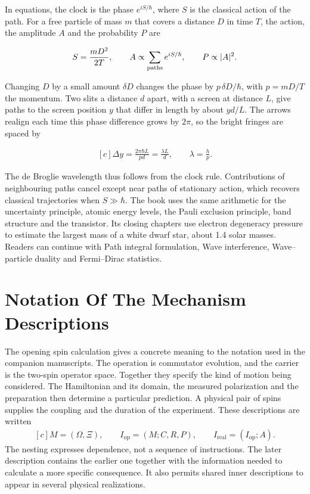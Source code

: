\documentclass[11pt,oneside]{book}
\newenvironment{centeredalign}{\[\begin{gathered}[c]}{\end{gathered}\]}
\begin{document}
In equations, the clock is the phase \(e^{iS/\hbar}\), where \(S\) is the classical action of the path. For a free particle of mass \(m\) that covers a distance \(D\) in time \(T\), the action, the amplitude \(A\) and the probability \(P\) are

\begin{centeredalign}
S=\frac{mD^2}{2T},\qquad A\propto\sum_{\rm paths}e^{iS/\hbar},\qquad P\propto|A|^2 .
\end{centeredalign}

Changing \(D\) by a small amount \(\delta D\) changes the phase by \(p\,\delta D/\hbar\), with \(p=mD/T\) the momentum. Two slits a distance \(d\) apart, with a screen at distance \(L\), give paths to the screen position \(y\) that differ in length by about \(yd/L\). The arrows realign each time this phase difference grows by \(2\pi\), so the bright fringes are spaced by

\begin{centeredalign}
\Delta y=\frac{2\pi\hbar L}{pd}=\frac{\lambda L}{d},\qquad \lambda=\frac{h}{p}.
\end{centeredalign}

The de Broglie wavelength thus follows from the clock rule. Contributions of neighbouring paths cancel except near paths of stationary action, which recovers classical trajectories when \(S\gg\hbar\). The book uses the same arithmetic for the uncertainty principle, atomic energy levels, the Pauli exclusion principle, band structure and the transistor. Its closing chapters use electron degeneracy pressure to estimate the largest mass of a white dwarf star, about 1.4 solar masses. Readers can continue with Path integral formulation, Wave interference, Wave--particle duality and Fermi--Dirac statistics.







\backmatter


\chapter{Notation Of The Mechanism Descriptions}\label{chap:notation}
The opening spin calculation gives a concrete meaning to the notation
used in the companion manuscripts. The operation is commutator
evolution, and the carrier is the two-spin operator space. Together
they specify the kind of motion being considered. The Hamiltonian
and its domain, the measured polarization and the preparation then
determine a particular prediction. A physical pair of spins supplies
the coupling and the duration of the experiment. These descriptions
are written
\begin{centeredalign}
M=(\Omega,\Xi),\qquad I_{\mathrm{op}}=(M;C,R,P),\qquad
I_{\mathrm{real}}=(I_{\mathrm{op}};A).
\end{centeredalign}
The nesting expresses dependence, not a sequence of instructions.
The later description contains the earlier one together with the
information needed to calculate a more specific consequence. It
also permits shared inner descriptions to appear in several physical
realizations.
\end{document}

